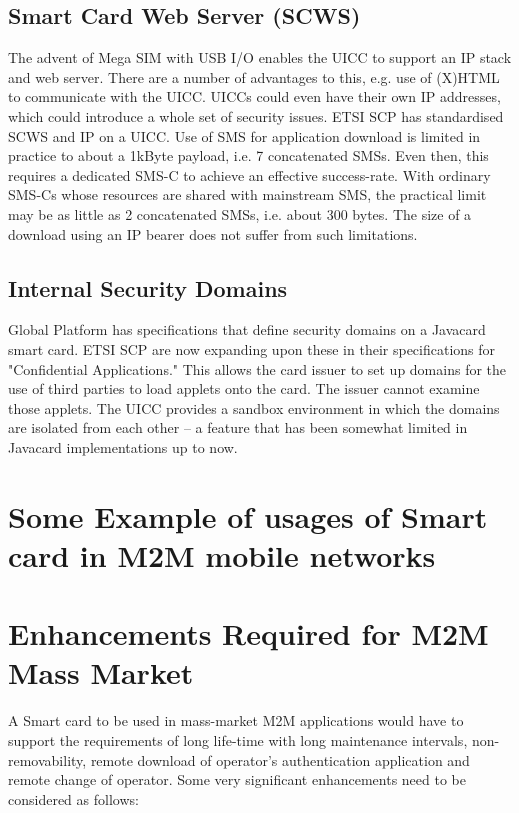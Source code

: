 \documentclass[12pt]{article}
\begin{document}
\subsection{Smart Card Web Server (SCWS)}
The advent of Mega SIM with USB I/O enables the UICC to support an IP stack and web server. There are a number of advantages to this, e.g. use of (X)HTML to communicate with the UICC. UICCs could even have their own IP addresses, which could introduce a whole set of security issues. ETSI SCP has standardised SCWS and IP on a UICC. Use of SMS for application download is limited in practice to about a 1kByte payload, i.e. 7 concatenated SMSs. Even then, this requires a dedicated SMS-C to achieve an effective success-rate. With ordinary SMS-Cs whose resources are shared with mainstream SMS, the practical limit may be as little as 2 concatenated SMSs, i.e. about 300 bytes. The size of a download using an IP bearer does not suffer from such limitations.

\subsection{Internal Security Domains}
Global Platform has specifications that define security domains on a Javacard smart card. ETSI SCP are now expanding upon these in their specifications for "Confidential Applications." This allows the card issuer to set up domains for the use of third parties to load applets onto the card. The issuer cannot examine those applets. The UICC provides a sandbox environment in which the domains are isolated from each other – a feature that has been somewhat limited in Javacard implementations up to now.



\section{Some Example of usages of Smart card in M2M mobile networks}






\section{Enhancements Required for M2M Mass Market}
A Smart card to be used in mass-market M2M applications would have to support the requirements of long life-time with long maintenance intervals, non-removability, remote download of operator’s authentication application and remote change of operator. Some very significant enhancements need to be considered as follows:
\end{document}
